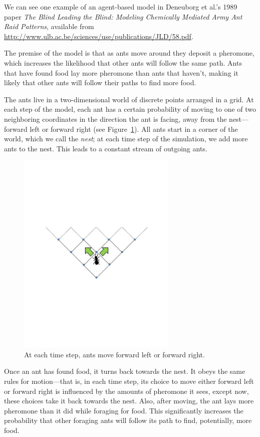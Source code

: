 \documentclass[10pt]{book}
\begin{document}
We can see one example of an agent-based model in Deneuborg et al.'s
1989 paper \emph{The Blind Leading the Blind: Modeling Chemically
  Mediated Army Ant Raid Patterns}, available from
\url{http://www.ulb.ac.be/sciences/use/publications/JLD/58.pdf}.

The premise of the model is that as ants move around they deposit
a pheromone, which increases the likelihood that other ants will follow
the same path. Ants that have found food lay more pheromone than ants
that haven't, making it likely that other ants will follow their paths
to find more food.

The ants live in a two-dimensional world of discrete points arranged
in a grid. At each step of the model, each ant has a certain
probability of moving to one of two neighboring coordinates in the
direction the ant is facing, away from the nest---forward left or
forward right (see Figure~\ref{fig.antchoice}). All ants start in a
corner of the world, which we call the \emph{nest}; at each time
step of the simulation, we add more ants to the nest. This leads to a
constant stream of outgoing ants.

\begin{figure}
\centerline{\includegraphics[width=3.0in]{figs/antchoice.pdf}}
\caption{At each time step, ants move forward left or forward right.\label{fig.antchoice}}
\end{figure}

Once an ant has found food, it turns back towards the nest. It obeys
the same rules for motion---that is, in each time step, its choice to
move either forward left or forward right is influenced by the amounts
of pheromone it sees, except now, these choices take it back towards
the nest. Also, after moving, the ant lays more pheromone than it did
while foraging for food. This significantly increases the probability
that other foraging ants will follow its path to find, potentially,
more food.
\end{document}
